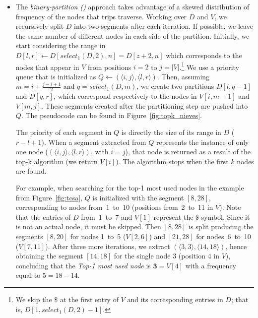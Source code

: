 \begin{itemize}[leftmargin=3mm]
\begin{itemize}
	\item The {\em binary-partition (\Stkbin)} approach takes advantage of a skewed 
	distribution of frequency of the nodes that trips traverse.  Working over $D$ and $V$, we 
	recursively split $D$  into two segments after each iteration. 
	If possible, we leave the same number of different nodes in each side of the partition. 
	Initially, we start considering the range in $D[l,r] \leftarrow D[select_1(D,2),n]=D[z+2,n]$ 
	which corresponds to the nodes that appear in 
	$V$ from positions $i=2$ to $j=|V|$.\footnote{We skip the $\$$ at the first entry of $V$ and its corresponding 
	entries in $D$; that is, $D[1,select_1(D,2)-1]$.}
	We use a priority queue that is initialized as $Q \leftarrow (\langle i,j\rangle, \langle l,r\rangle)$.
	Then, assuming $m=i + \frac{j-i+1}{2}$ and $q=select_1(D,m)$, we create two partitions 
	$D[l, q-1]$ and  $D[q, r]$, which correspond respectively to the nodes in $V[i,m-1]$ and $V[m, j]$.
	These  segments created after the partitioning step are
	pushed into  $Q$. %
	The pseudocode can be found in  Figure~\ref{fig:topk_nieves}.

	The priority of each segment in $Q$ is
	directly the size of its range in $D$ ($r-l+1$). 
	When a segment extracted from $Q$ represents the instance of only one node ($(\langle i,j\rangle, \langle l,r\rangle)$, with $i=j$),
	that node is returned as a result of the top-k algorithm (we return $V[i]$). The algorithm stops when the first $k$
	nodes are found.

	For example, when searching for the top-1 most used nodes in the example from Figure~\ref{fig:tcsa}, $Q$ is initialized with
	the segment $[8, 28]$, corresponding to nodes from~1~to~10 (positions from~2~to~11 in $V$). Note
	that the entries of $D$ from~1~to~7 and $V[1]$ represent the $\$$ symbol. Since it is not an actual node, it
	 must be skipped. Then $[8, 28]$ is split producing the segments $[8, 20]$ for nodes 1~to~5 ($V[2,6]$)
	and $[21, 28]$ for nodes~6~to~10 ($V[7,11]$). After three more iterations, we extract
	$(\langle 3,3\rangle, \langle 14,18\rangle)$, hence obtaining the segment $[14, 18]$ for
	the single node 3 (position $4$ in $V$), concluding that the  {\em Top-1 most used node} is 
	$\mathbf{3}=V[4]$ with a frequency equal to $5=18-14$.


\end{itemize}
\end{itemize}
